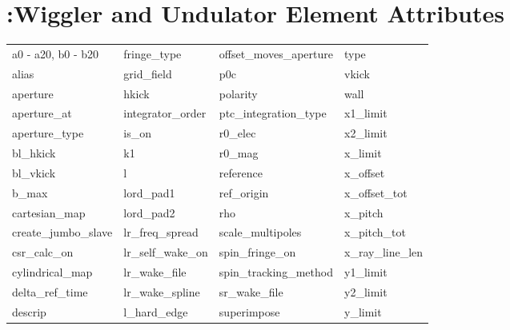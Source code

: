  \section{:Wiggler and Undulator Element Attributes}
 \label{s:list.wiggler}
 
 \begin{tabular}{llll} \toprule
a0 - a20, b0 - b20          & fringe_type                 & offset_moves_aperture       & type                        \\
alias                       & grid_field                  & p0c                         & vkick                       \\
aperture                    & hkick                       & polarity                    & wall                        \\
aperture_at                 & integrator_order            & ptc_integration_type        & x1_limit                    \\
aperture_type               & is_on                       & r0_elec                     & x2_limit                    \\
bl_hkick                    & k1                          & r0_mag                      & x_limit                     \\
bl_vkick                    & l                           & reference                   & x_offset                    \\
b_max                       & lord_pad1                   & ref_origin                  & x_offset_tot                \\
cartesian_map               & lord_pad2                   & rho                         & x_pitch                     \\
create_jumbo_slave          & lr_freq_spread              & scale_multipoles            & x_pitch_tot                 \\
csr_calc_on                 & lr_self_wake_on             & spin_fringe_on              & x_ray_line_len              \\
cylindrical_map             & lr_wake_file                & spin_tracking_method        & y1_limit                    \\
delta_ref_time              & lr_wake_spline              & sr_wake_file                & y2_limit                    \\
descrip                     & l_hard_edge                 & superimpose                 & y_limit                     \\

\end{tabular}
